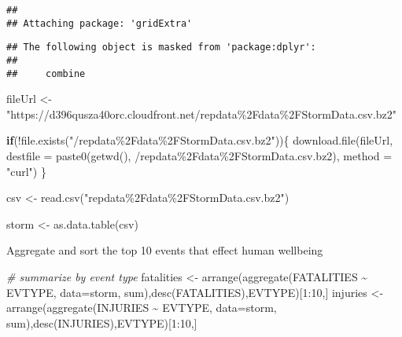 \documentclass[
]{article}
\newenvironment{Shaded}{\begin{snugshade}}{\end{snugshade}}
\newcommand{\AttributeTok}[1]{\textcolor[rgb]{0.77,0.63,0.00}{#1}}
\newcommand{\CommentTok}[1]{\textcolor[rgb]{0.56,0.35,0.01}{\textit{#1}}}
\newcommand{\ControlFlowTok}[1]{\textcolor[rgb]{0.13,0.29,0.53}{\textbf{#1}}}
\newcommand{\DecValTok}[1]{\textcolor[rgb]{0.00,0.00,0.81}{#1}}
\newcommand{\FunctionTok}[1]{\textcolor[rgb]{0.00,0.00,0.00}{#1}}
\newcommand{\NormalTok}[1]{#1}
\newcommand{\OtherTok}[1]{\textcolor[rgb]{0.56,0.35,0.01}{#1}}
\newcommand{\SpecialCharTok}[1]{\textcolor[rgb]{0.00,0.00,0.00}{#1}}
\newcommand{\StringTok}[1]{\textcolor[rgb]{0.31,0.60,0.02}{#1}}
\begin{document}
\begin{verbatim}
## 
## Attaching package: 'gridExtra'
\end{verbatim}

\begin{verbatim}
## The following object is masked from 'package:dplyr':
## 
##     combine
\end{verbatim}

\begin{Shaded}
\begin{Highlighting}[]
\NormalTok{fileUrl }\OtherTok{\textless{}{-}} \StringTok{"https://d396qusza40orc.cloudfront.net/repdata\%2Fdata\%2FStormData.csv.bz2"}

\ControlFlowTok{if}\NormalTok{(}\SpecialCharTok{!}\FunctionTok{file.exists}\NormalTok{(}\StringTok{"/repdata\%2Fdata\%2FStormData.csv.bz2\textquotesingle{}"}\NormalTok{))\{}
  \FunctionTok{download.file}\NormalTok{(fileUrl, }\AttributeTok{destfile =} \FunctionTok{paste0}\NormalTok{(}\FunctionTok{getwd}\NormalTok{(), }\StringTok{\textquotesingle{}/repdata\%2Fdata\%2FStormData.csv.bz2\textquotesingle{}}\NormalTok{), }\AttributeTok{method =} \StringTok{"curl"}\NormalTok{)}
\NormalTok{\}}

\NormalTok{csv }\OtherTok{\textless{}{-}} \FunctionTok{read.csv}\NormalTok{(}\StringTok{"repdata\%2Fdata\%2FStormData.csv.bz2"}\NormalTok{)}

\NormalTok{storm }\OtherTok{\textless{}{-}} \FunctionTok{as.data.table}\NormalTok{(csv)}
\end{Highlighting}
\end{Shaded}

Aggregate and sort the top 10 events that effect human wellbeing

\begin{Shaded}
\begin{Highlighting}[]
\CommentTok{\# summarize by event type}
\NormalTok{fatalities }\OtherTok{\textless{}{-}} \FunctionTok{arrange}\NormalTok{(}\FunctionTok{aggregate}\NormalTok{(FATALITIES }\SpecialCharTok{\textasciitilde{}}\NormalTok{ EVTYPE, }\AttributeTok{data=}\NormalTok{storm, sum),}\FunctionTok{desc}\NormalTok{(FATALITIES),EVTYPE)[}\DecValTok{1}\SpecialCharTok{:}\DecValTok{10}\NormalTok{,]}
\NormalTok{injuries }\OtherTok{\textless{}{-}} \FunctionTok{arrange}\NormalTok{(}\FunctionTok{aggregate}\NormalTok{(INJURIES }\SpecialCharTok{\textasciitilde{}}\NormalTok{ EVTYPE, }\AttributeTok{data=}\NormalTok{storm, sum),}\FunctionTok{desc}\NormalTok{(INJURIES),EVTYPE)[}\DecValTok{1}\SpecialCharTok{:}\DecValTok{10}\NormalTok{,]}
\end{Highlighting}
\end{Shaded}
\end{document}
